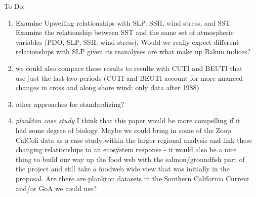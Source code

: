 \documentclass[
]{article}
\begin{document}
To Do:

\begin{enumerate}
\def\labelenumi{\arabic{enumi})}
\item
  Examine Upwelling relationships with SLP, SSH, wind stress, and SST
  Examine the relationship between SST and the same set of atmospheric
  variables (PDO, SLP, SSH, wind stress). Would we really expect
  different relationships with SLP given its reanalyses are what make up
  Bakun indices?
\item
  we could also compare these results to results with CUTI and BEUTI
  that use just the last two periods (CUTI and BEUTI account for more
  nuanced changes in cross and along shore wind; only data after 1988)
\item
  other approaches for standardizing?
\item
  \emph{plankton case study} I think that this paper would be more
  compelling if it had some degree of biology. Maybe we could bring in
  some of the Zoop CalCofi data as a case study within the larger
  regional analysis and link these changing relationships to an
  ecosystem response - it would also be a nice thing to build our way up
  the food web with the salmon/groundfish part of the project and still
  take a foodweb wide view that was initially in the proposal. Are there
  are plankton datasets in the Southern California Current and/or GoA we
  could use?
\end{enumerate}
\end{document}
